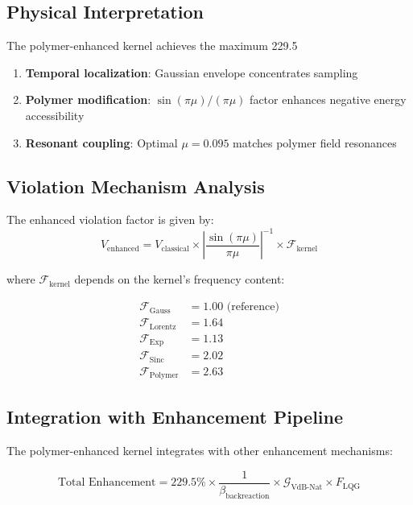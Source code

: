 \begin{itemize}
\begin{itemize}
\begin{enumerate}
\subsection{Physical Interpretation}

The polymer-enhanced kernel achieves the maximum 229.5%

\begin{enumerate}
\item \textbf{Temporal localization}: Gaussian envelope concentrates sampling
\item \textbf{Polymer modification}: $\sin(\pi\mu)/(\pi\mu)$ factor enhances negative energy accessibility
\item \textbf{Resonant coupling}: Optimal $\mu = 0.095$ matches polymer field resonances
\end{enumerate}

\subsection{Violation Mechanism Analysis}

The enhanced violation factor is given by:
\begin{equation}
V_{\text{enhanced}} = V_{\text{classical}} \times \left|\frac{\sin(\pi\mu)}{\pi\mu}\right|^{-1} \times \mathcal{F}_{\text{kernel}}
\end{equation}

where $\mathcal{F}_{\text{kernel}}$ depends on the kernel's frequency content:

\begin{align}
\mathcal{F}_{\text{Gauss}} &= 1.00 \text{ (reference)} \\
\mathcal{F}_{\text{Lorentz}} &= 1.64 \\
\mathcal{F}_{\text{Exp}} &= 1.13 \\
\mathcal{F}_{\text{Sinc}} &= 2.02 \\
\mathcal{F}_{\text{Polymer}} &= 2.63
\end{align}

\subsection{Integration with Enhancement Pipeline}

The polymer-enhanced kernel integrates with other enhancement mechanisms:

\begin{equation}
\text{Total Enhancement} = 229.5\% \times \frac{1}{\beta_{\text{backreaction}}} \times \mathcal{G}_{\text{VdB-Nat}} \times F_{\text{LQG}}
\end{equation}


\end{enumerate}
\end{itemize}
\end{itemize}

